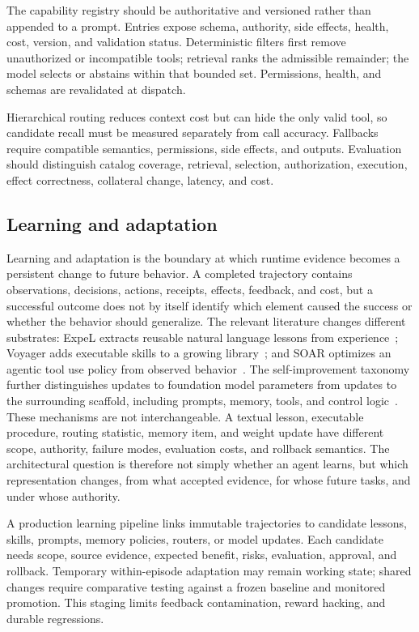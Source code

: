 The capability registry should be authoritative and versioned rather than appended to a prompt. Entries expose schema, authority, side effects, health, cost, version, and validation status. Deterministic filters first remove unauthorized or incompatible tools; retrieval ranks the admissible remainder; the model selects or abstains within that bounded set. Permissions, health, and schemas are revalidated at dispatch.

Hierarchical routing reduces context cost but can hide the only valid tool, so candidate recall must be measured separately from call accuracy. Fallbacks require compatible semantics, permissions, side effects, and outputs. Evaluation should distinguish catalog coverage, retrieval, selection, authorization, execution, effect correctness, collateral change, latency, and cost.

\subsection{Learning and adaptation}
\label{sec:learning}

Learning and adaptation is the boundary at which runtime evidence becomes a persistent change to future behavior. A completed trajectory contains observations, decisions, actions, receipts, effects, feedback, and cost, but a successful outcome does not by itself identify which element caused the success or whether the behavior should generalize. The relevant literature changes different substrates: ExpeL extracts reusable natural language lessons from experience~\cite{zhao2024expel}; Voyager adds executable skills to a growing library~\cite{wang2023voyager}; and SOAR optimizes an agentic tool use policy from observed behavior~\cite{li2026soar}. The self-improvement taxonomy further distinguishes updates to foundation model parameters from updates to the surrounding scaffold, including prompts, memory, tools, and control logic~\cite{ren2026selfimprovingagents}. These mechanisms are not interchangeable. A textual lesson, executable procedure, routing statistic, memory item, and weight update have different scope, authority, failure modes, evaluation costs, and rollback semantics. The architectural question is therefore not simply whether an agent learns, but which representation changes, from what accepted evidence, for whose future tasks, and under whose authority.

A production learning pipeline links immutable trajectories to candidate lessons, skills, prompts, memory policies, routers, or model updates. Each candidate needs scope, source evidence, expected benefit, risks, evaluation, approval, and rollback. Temporary within-episode adaptation may remain working state; shared changes require comparative testing against a frozen baseline and monitored promotion. This staging limits feedback contamination, reward hacking, and durable regressions.

